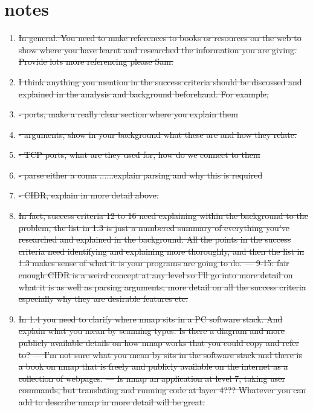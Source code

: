 \documentclass{article}
\begin{document}
\section{notes}
\begin{enumerate}
  \item{\sout{In general. You need to make references to books or resources on the web to show where you have learnt and researched the information you are giving. Provide lots more referencing please Sam. }}
  \item{\sout{I think anything you mention in the success criteria should be discussed and explained in the analysis and background beforehand. For example, }}
  \item{\sout{- ports, make a really clear section where you explain them }}
  \item{\sout{- arguments, show in your background what these are and how they relate. }}
  \item{\sout{- TCP ports, what are they used for, how do we connect to them}}
  \item{\sout{- parse either a coma ......explain parsing and why this is required}}
  \item{\sout{- CIDR, explain in more detail above. }}
  \item{\sout{In fact, success criteria 12 to 16 need explaining within the background to the problem, the list in 1.3 is just a numbered summary of everything you’ve researched and explained in the background. All the points in the success criteria need identifying and explaining more thoroughly, and then the list in 1.3 makes sense of what it is your programs are going to do. --- 9-15: fair enough CIDR is a weird concept at any level so I'll go into more detail on what it is as well as parsing arguments, more detail on all the success criteria especially why they are desirable features etc.}}
  \item{\sout{In 1.4 you need to clarify where nmap sits in a PC software stack. And explain what you mean by scanning types. Is there a diagram and more publicly available details on how nmap works that you could copy and refer to? --- I'm not sure what you mean by sits in the software stack and there is a book on nmap that is freely and publicly available on the internet as a collection of webpages. --- Is nmap an application at level 7, taking user commands, but translating and running code at layer 4??? Whatever you can add to describe nmap in more detail will be great.}}

\end{enumerate}
\end{document}
